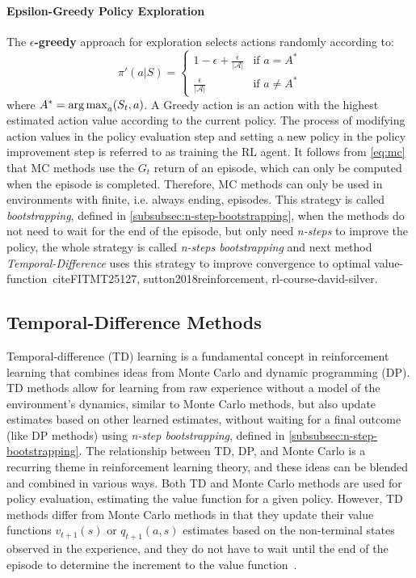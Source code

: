 \documentclass[../xlapes02]{subfiles}
\begin{document}
    \paragraph{Epsilon-Greedy Policy Exploration}
    The \textbf{$\epsilon$-greedy} approach for exploration selects actions randomly according to:
    \begin{equation}
        \pi'(a|S)=
        \begin{cases}
            1-\epsilon+\frac{\epsilon}{|\mathcal{A}|}&\text{if }a=A^*\\
            \frac{\epsilon}{|\mathcal{A}|}&\text{if }a\neq A^*
        \end{cases}
    \end{equation}
    where $A^*=\operatorname*{arg\,max}_{a}(S_t, a)$. A Greedy action is an action with the highest estimated action value according to the current policy. The process of modifying action values in the policy evaluation step and setting a new policy in the policy improvement step is referred to as training the RL agent. It follows from \cref{eq:mc} that MC methods use the $G_t$ return of an episode, which can only be computed when the episode is completed. Therefore, MC methods can only be used in environments with finite, i.e. always ending, episodes. This strategy is called \emph{bootstrapping}, defined in \cref{subsubsec:n-step-bootstrapping}, when the methods do not need to wait for the end of the episode, but only need \emph{n-steps} to improve the policy, the whole strategy is called \emph{n-steps bootstrapping} and next method \emph{Temporal-Difference} uses this strategy to improve convergence to optimal value-function~cite{FITMT25127, sutton2018reinforcement, rl-course-david-silver}.

    \subsection{Temporal-Difference Methods}\label{subsec:temporal-difference-methods}

    Temporal-difference (TD) learning is a fundamental concept in reinforcement learning that combines ideas from Monte Carlo and dynamic programming (DP). TD methods allow for learning from raw experience without a model of the environment's dynamics, similar to Monte Carlo methods, but also update estimates based on other learned estimates, without waiting for a final outcome (like DP methods) using \emph{n-step bootstrapping}, defined in \cref{subsubsec:n-step-bootstrapping}. The relationship between TD, DP, and Monte Carlo is a recurring theme in reinforcement learning theory, and these ideas can be blended and combined in various ways. Both TD and Monte Carlo methods are used for policy evaluation, estimating the value function for a given policy. However, TD methods differ from Monte Carlo methods in that they update their value functions $v_{t+1}(s)$ or $q_{t+1}(a,s)$ estimates based on the non-terminal states observed in the experience, and they do not have to wait until the end of the episode to determine the increment to the value function~\cite{rl-course-david-silver, sutton2018reinforcement}.
\end{document}
